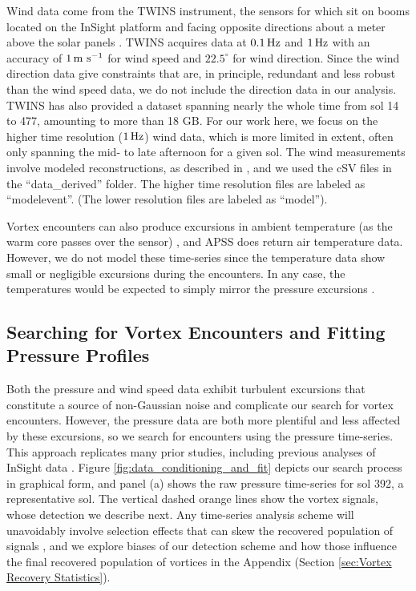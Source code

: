 \documentclass{aastex63}
\begin{document}
Wind data come from the TWINS instrument, the sensors for which sit on booms located on the InSight platform and facing opposite directions about a meter above the solar panels \citep{2020NatGe..13..190B}. TWINS acquires data at $0.1\, {\rm Hz}$ and $1\, {\rm Hz}$ with an accuracy of $1\, {\rm m\ s^{-1}}$ for wind speed and $22.5^\circ$ for wind direction. Since the wind direction data give constraints that are, in principle, redundant and less robust than the wind speed data, we do not include the direction data in our analysis. TWINS has also provided a dataset spanning nearly the whole time from sol 14 to 477, amounting to more than 18 GB. For our work here, we focus on the higher time resolution ($1\, {\rm Hz}$) wind data, which is more limited in extent, often only spanning the mid- to late afternoon for a given sol. The wind measurements involve modeled reconstructions, as described in  \citep{Banfield2018}, and we used the cSV files in the ``data\_derived'' folder. The higher time resolution files are labeled as ``modelevent''. (The lower resolution files are labeled as ``model'').

Vortex encounters can also produce excursions in ambient temperature (as the warm core passes over the sensor) \citep{2016SSRv..203...39M}, and APSS does return air temperature data. However, we do not model these time-series since the temperature data show small or negligible excursions during the encounters. In any case, the temperatures would be expected to simply mirror the pressure excursions \citep{2016Icar..271..326L}.

\subsection{Searching for Vortex Encounters and Fitting Pressure Profiles}
Both the pressure and wind speed data exhibit turbulent excursions that constitute a source of non-Gaussian noise and complicate our search for vortex encounters. However, the pressure data are both more plentiful and less affected by these excursions, so we search for encounters using the pressure time-series. This approach replicates many prior studies, including previous analyses of InSight data \citep{2020arXiv200501134S, 2021Icar..35514119L}. Figure \ref{fig:data_conditioning_and_fit} depicts our search process in graphical form, and panel (a) shows the raw pressure time-series for sol 392, a representative sol. The vertical dashed orange lines show the vortex signals, whose detection we describe next. Any time-series analysis scheme will unavoidably involve selection effects that can skew the recovered population of signals \citep{2018Icar..299..166J}, and we explore biases of our detection scheme and how those influence the final recovered population of vortices in the Appendix (Section \ref{sec:Vortex Recovery Statistics}). 
\end{document}
